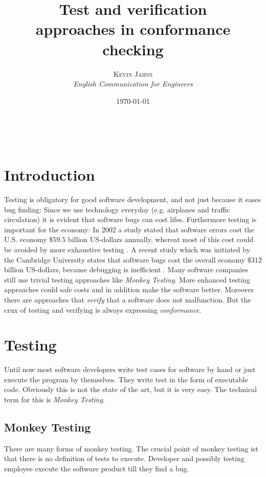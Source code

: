 \documentclass[a4paper, 12pt]{article} %
\title{\textbf{Test and verification}\\ %
approaches in conformance checking} %
\author{\textsc{Kevin Jahns} %
\\{\textit{English Communication for Engineers}}} %
\date{\today} %
\makeatletter
\renewcommand{\maketitle}{ %
\begin{flushright} %
{\LARGE\@title} %

\vspace{50pt} %

{\large\@author} %
\\\@date %

\vspace{40pt} %
\end{flushright}
}
\makeatother
\begin{document}
\maketitle %


\section*{Introduction}
Testing is obligatory for good software development, and not just because it
eases bug finding: Since we use technology everyday (e.g. airplanes and traffic
circulation) it is evident that software bugs can cost lifes. Furthermore
testing is important for the economy: In 2002 a study stated that software errors cost the U.S.
economy $ \$59.5$ billion US-dollars annually, whereat most of this cost could
be avoided by more exhaustive testing \cite{nist}. A recent study which was
initiated by the Cambridge University states that software bugs cost the 
overall economy $ \$ 312 $  billion US-dollars, because debugging is inefficient
\cite{cambridge_errors}.
Many software companies still use trivial testing approaches like
\textit{Monkey Testing}. More enhanced testing approaches could safe costs and 
in addition make the software better. Moreover there are approaches that 
\textit{verify} that a software does not malfunction. But the crux of
testing and verifying is always expressing \textit{conformance}. 

\section*{Testing}
Until now most software developers write test cases for software by hand or just
execute the program by themselves. They write test in the form of executable
code. Obviously this is not the state of the art, but it is very easy. The
technical term for this is \textit{Monkey Testing}.

\subsection*{Monkey Testing}
There are many forms of monkey testing. The crucial point of monkey testing ist
that there is no definition of tests to execute. Developer and possibly testing
employee execute the software product till they find a bug. 
\end{document}
